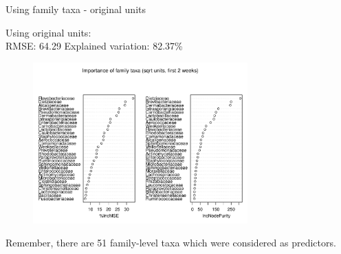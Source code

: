 \documentclass{beamer}
\begin{document}
\begin{frame}{Using family taxa - original units}
  
  {\scriptsize
    
  \noindent Using original units:\\
  RMSE: 64.29  \hspace{0.05in}  Explained variation: 82.37\%

  \begin{center}
    \begin{figure}
      \includegraphics[width=3.25in]{../only_families/first_two_weeks/sqrt_units_first_two_weeks_families_imp_plot}
    \end{figure}
  \end{center}
  \vspace{-0.25in}

\noindent Remember, there are 51 family-level taxa which were
considered as predictors.
}

\end{frame}
\end{document}
